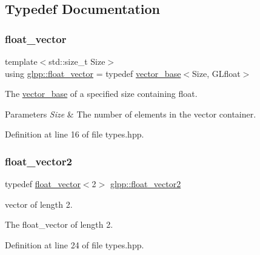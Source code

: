\subsection{Typedef Documentation}
\mbox{\label{namespaceglpp_a6c618584338a9ebf15759cea2401f0ae}} 
\subsubsection{\texorpdfstring{float\+\_\+vector}{float\_vector}}
{\footnotesize\ttfamily template$<$std\+::size\+\_\+t Size$>$ \\
using \hyperlink{namespaceglpp_a6c618584338a9ebf15759cea2401f0ae}{glpp\+::float\+\_\+vector} = typedef \hyperlink{classglpp_1_1vector__base}{vector\+\_\+base}$<$Size, G\+Lfloat$>$}



The \hyperlink{classglpp_1_1vector__base}{vector\+\_\+base} of a specified size containing {\ttfamily float}. 


\begin{DoxyParams}{Parameters}
{\em Size} & The number of elements in the vector container. \\
\hline
\end{DoxyParams}


Definition at line 16 of file types.\+hpp.

\mbox{\label{namespaceglpp_ace2f7da7495fc7d1623d97a444c87146}} 
\subsubsection{\texorpdfstring{float\+\_\+vector2}{float\_vector2}}
{\footnotesize\ttfamily typedef \hyperlink{namespaceglpp_a6c618584338a9ebf15759cea2401f0ae}{float\+\_\+vector}$<$2$>$ \hyperlink{namespaceglpp_ace2f7da7495fc7d1623d97a444c87146}{glpp\+::float\+\_\+vector2}}



vector of length 2. 

The float\+\_\+vector of length 2. 

Definition at line 24 of file types.\+hpp.

\mbox{\label{namespaceglpp_a3fa7b207a8b7dba583fb22731a616d73}} 
